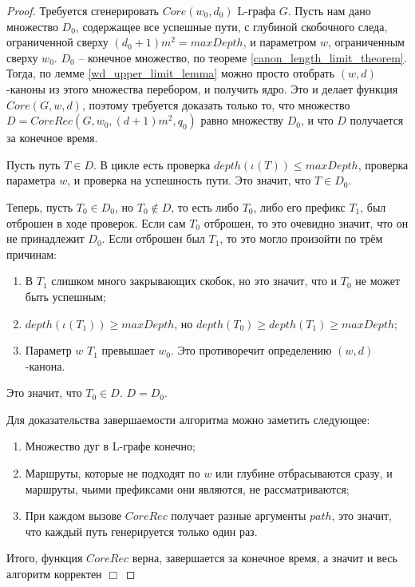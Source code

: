 \begin{proof}
    Требуется сгенерировать $Core(w_0, d_0)$ L-графа $G$. 
    Пусть нам дано множество $D_0$, содержащее все успешные пути, 
    с глубиной скобочного следа, ограниченной сверху $(d_0+1)m^2 = maxDepth$, 
    и параметром $w$, ограниченным сверху $w_0$. 
    $D_0$ -- конечное множество, по теореме \ref{canon_length_limit_theorem}.
    Тогда, по лемме \ref{wd_upper_limit_lemma} можно просто отобрать $(w,d)$-каноны из этого множества перебором, 
    и получить ядро. 
    Это и делает функция $Core(G, w, d)$, поэтому требуется доказать только то, 
    что множество $D = CoreRec(G, w_0, (d+1)m^2, q_0)$ равно множеству $D_0$, и что $D$ получается за конечное время.

    Пусть путь $T \in D$. В цикле есть проверка $depth(\iota(T)) \leq maxDepth$, проверка параметра $w$, и проверка на успешность пути.
    Это значит, что $T \in D_0$.

    Теперь, пусть $T_0 \in D_0$, но $T_0 \notin D$, то есть либо $T_0$, либо его префикс $T_1$, был отброшен в ходе проверок.
    Если сам $T_0$ отброшен, то это очевидно значит, что он не принадлежит $D_0$.
    Если отброшен был $T_1$, то это могло произойти по трём причинам:
    \begin{enumerate}
        \item В $T_1$ слишком много закрывающих скобок, но это значит, что и $T_0$ не может быть успешным;
        \item $depth(\iota(T_1)) \ge maxDepth$, но $depth(T_0) \geq depth(T_1) \ge maxDepth$;
        \item Параметр $w$ $T_1$ превышает $w_0$. Это противоречит определению $(w,d)$-канона.
    \end{enumerate}
    Это значит, что $T_0 \in D$. $D = D_0$.

    Для доказательства завершаемости алгоритма можно заметить следующее:
    \begin{enumerate}
        \item Множество дуг в L-графе конечно;
        \item Маршруты, которые не подходят по $w$ или глубине отбрасываются сразу, и маршруты, чьими префиксами они являются, не рассматриваются;
        \item При каждом вызове $CoreRec$ получает разные аргументы $path$, это значит, что каждый путь генерируется только один раз.
    \end{enumerate}

    Итого, функция $CoreRec$ верна, завершается за конечное время, а значит и весь алгоритм корректен $\Box$ 
\end{proof}

